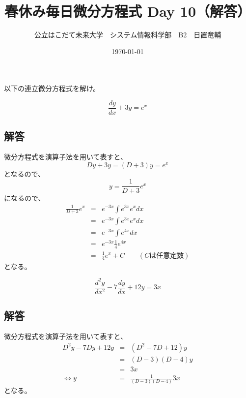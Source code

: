 \documentclass[dvipdfmx,uplatex]{jsarticle}
\title{春休み毎日微分方程式 Day 10（解答）}
\author{公立はこだて未来大学　システム情報科学部　B2　日置竜輔}
\date{\today}
\begin{document}
\begin{spacing}{1.6}
\maketitle

以下の連立微分方程式を解け。\\
\begin{qparts}
  \qpart
  \begin{equation*}
    \frac{dy}{dx} + 3y = e ^ x
  \end{equation*}

  \subsection*{解答}

  微分方程式を演算子法を用いて表すと、
  \begin{equation*}
    Dy + 3y = (D + 3)y = e ^ x
  \end{equation*}
  となるので、
  \begin{equation*}
    y = \frac{1}{D + 3}e ^ x
  \end{equation*}
  になるので、
  \begin{eqnarray*}
    \frac{1}{D + 3}e ^ x & = & e ^ {-3x} \int e ^ {3x} e ^ x dx \\
    & = & e ^ {-3x} \int e ^ {3x} e ^ x dx \\
    & = & e ^ {-3x} \int e ^ {4x} dx \\
    & = & e ^ {-3x} \frac{1}{4}e ^ {4x} \\
    & = & \frac{1}{4}e ^ x + C \qquad (Cは任意定数)
  \end{eqnarray*}
  となる。

  \newpage

  \qpart
  \begin{equation*}
    \frac{d^2y}{dx^2} - 7 \frac{dy}{dx} + 12y = 3x
  \end{equation*}

  \subsection*{解答}

  微分方程式を演算子法を用いて表すと、
  \begin{eqnarray*}
    D ^ 2y - 7Dy + 12y & = & (D ^ 2 - 7D + 12)y \\
    & = & (D - 3)(D - 4)y \\
    & = & 3x \\
    \Leftrightarrow
    y & = & \frac{1}{(D - 3)(D - 4)}3x
   \end{eqnarray*}
   となる。\\


\end{qparts}
\end{spacing}
\end{document}
